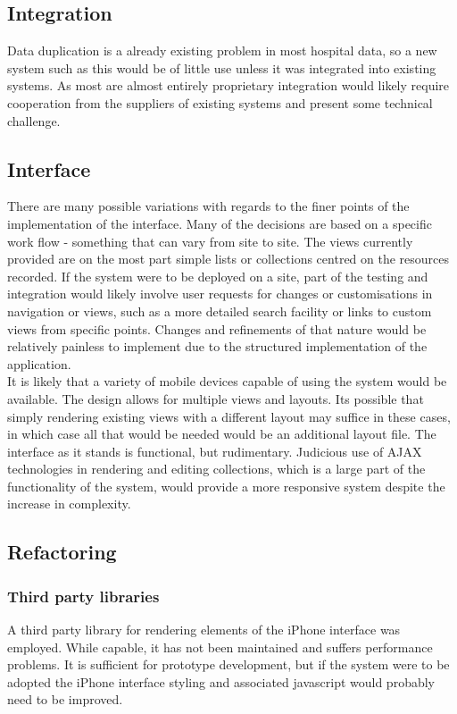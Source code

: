 \documentclass[letterpaper]{amsart}
\begin{document}
\subsection{Integration}
Data duplication is a already existing problem in most hospital data, so a new system such as this would be of little use unless it was integrated into existing systems.  As most are almost entirely proprietary integration would likely require cooperation from the suppliers of existing systems and present some technical challenge.
\subsection{Interface}
There are many possible variations with regards to the finer points of the implementation of the interface.  Many of the decisions are based on a specific work flow - something that can vary from site to site.  The views currently provided are on the most part simple lists or collections centred on the resources recorded.  If the system were to be deployed on a site, part of the testing and integration would likely involve user requests for changes or customisations in navigation or views, such as a more detailed search facility or links to custom views from specific points.  Changes and refinements of that nature would be relatively painless to implement due to the structured implementation of the application.\\
It is likely that a variety of mobile devices capable of using the system would be available.  The design allows for multiple views and layouts.  Its possible that simply rendering existing views with a different layout may suffice in these cases, in which case all that would be needed would be an additional layout file.  The interface as it stands is functional, but rudimentary.  Judicious use of AJAX technologies in rendering and editing collections, which is a large part of the functionality of the system, would provide a more responsive system despite the increase in complexity.
\subsection{Refactoring}
\subsubsection{Third party libraries}
A third party library for rendering elements of the iPhone interface was employed.  While capable, it has not been maintained and suffers performance problems.  It is sufficient for prototype development, but if the system were to be adopted the iPhone interface styling and associated javascript would probably need to be improved.
\end{document}
